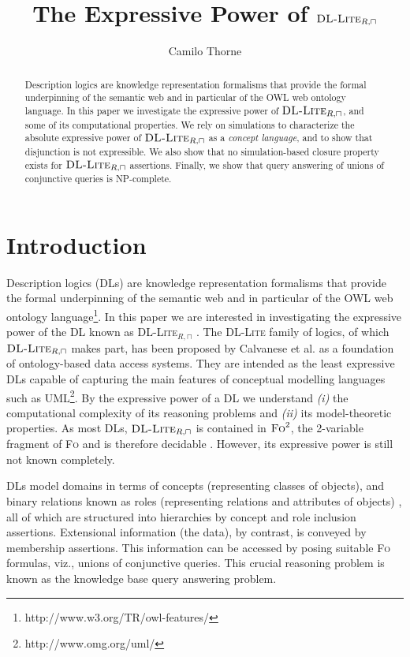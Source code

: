 \documentclass[11pt]{llncs}
\title{The Expressive Power of $\dlliterc$}
\author{
Camilo Thorne
}
\institute{
\begin{tabular}{c}
IBM CAS Trento - Trento RISE\\
Piazza Manci 17\\
38123, Povo di Trento (Italy)\\
{\tt c.thorne.email@trentorise.eu}
\end{tabular}
}
\newcommand{\logic}[1]{\textsc{#1}\xspace}
\newcommand{\FOL}{\logic{Fo}}
\newcommand{\g}[1]{\logic{#1}}
\newcommand{\NP}{\textsc{NP}\xspace}
\newcommand{\dlliterc}{\g{DL-Lite}_{R,\sqcap}\xspace}
\begin{document}
\maketitle



\begin{abstract}
Description logics are knowledge representation formalisms
that provide the formal underpinning of the semantic 
web and in particular of the OWL web ontology language.
In this paper we investigate the
expressive power of $\dlliterc$, and some of
its computational properties. We rely on simulations
to characterize the absolute expressive power of $\dlliterc$
as a {\em concept language}, and to show that disjunction is not expressible.
We also show that no simulation-based closure property exists
for $\dlliterc$ assertions. Finally, we show
that query answering of unions of conjunctive queries is
\NP-complete.
\end{abstract}

\section{Introduction}\label{intro}


Description logics (DLs) are knowledge representation formalisms
that provide the formal underpinning of the semantic 
web and in particular of the OWL web ontology language\footnote{http://www.w3.org/TR/owl-features/}.
In this paper we are interested in investigating the
expressive power of the DL known as \g{DL-Lite}$_{R,\sqcap}$
\cite{Calvanese2006B}. The \g{DL-Lite} family of logics, of which
$\dlliterc$ makes part,
has been proposed by Calvanese et al. as a foundation of
ontology-based data access systems. They are intended
\cite{Calvanese2005A,Calvanese2007D}
as the least expressive DLs capable of capturing the main
features of conceptual modelling languages such as UML\footnote{http://www.omg.org/uml/}.
By the expressive power of a DL we understand
\textit{(i)} the
computational complexity of its reasoning problems
and \textit{(ii)} its model-theoretic properties.
As most DLs, $\dlliterc$ 
is contained in $\FOL^2$, the 2-variable
fragment of \FOL and is therefore decidable
\cite{Borgida1996,Hudstadt2004,DLHandbook}. However,
its expressive power is still not known completely.

DLs model
domains in terms
of concepts (representing classes of objects), 
and binary relations known as roles (representing relations and
attributes of objects) \cite{DLHandbook}, all of which
are structured
into hierarchies by concept and role inclusion assertions.
Extensional information (the data), by contrast,
is conveyed by membership assertions. 
This information can be accessed by posing suitable \FOL
formulas, viz., unions of conjunctive queries.
This crucial reasoning problem is known as the knowledge
base query answering problem.
\end{document}
